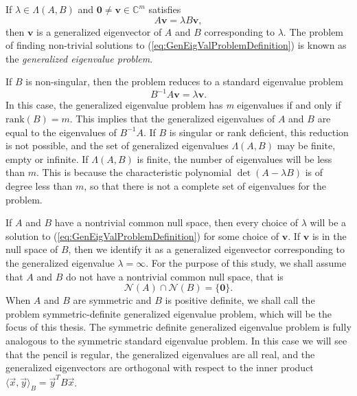 If $\lambda \in \Lambda(A, B)$ and $\mathbf{0} \neq \mathbf{v} \in \mathbb{C}^m$ satisfies
\begin{equation}\label{eq:GenEigValProblemDefinition}
	A\mathbf{v} = \lambda B\mathbf{v},
\end{equation}
then $\mathbf{v}$ is a generalized eigenvector of $A$ and $B$ corresponding to $\lambda$. The problem of finding non-trivial solutions to (\ref{eq:GenEigValProblemDefinition}) is known as the \textit{generalized eigenvalue problem}.

If $B$ is non-singular, then the problem reduces to a standard eigenvalue problem
\begin{equation}\label{eq:StandardReduction}
	B^{-1}A \mathbf{v} = \lambda \mathbf{v}.
\end{equation}
In this case, the generalized eigenvalue problem has \textit{m} eigenvalues if and only if $\text{rank}(B) = m$. This implies that the generalized eigenvalues of $A$ and $B$ are equal to the eigenvalues of $B^{-1}A$. If $B$ is singular or rank deficient, this reduction is not possible, and the set of generalized eigenvalues $\Lambda(A, B)$ may be finite, empty or infinite. If $\Lambda(A, B)$ is finite, the number of eigenvalues will be less than $m$. This is because the characteristic polynomial $\det(A- \lambda B)$ is of degree less than $m$, so that there is not a complete set of eigenvalues for the problem.

If $A$ and $B$ have a nontrivial common null space, then every choice of $\lambda$ will be a solution to (\ref{eq:GenEigValProblemDefinition}) for some choice of $\mathbf{v}$. If $\mathbf{v}$ is in the null space of $B$, then we identify it as a generalized eigenvector corresponding to the generalized eigenvalue $\lambda = \infty$. For the purpose of this study, we shall assume that $A$ and $B$ do not have a nontrivial common null space, that is
\begin{equation}\label{eq:EmptyCommonNullSpace}
	\mathcal{N}(A) \cap \mathcal{N}(B) = \{\mathbf{0} \}.
\end{equation}
When $A$ and $B$ are symmetric and $B$ is positive definite, we shall call the problem symmetric-definite generalized eigenvalue problem, which will be the focus of this thesis. The symmetric definite generalized eigenvalue problem is fully analogous to the symmetric standard eigenvalue problem.  In this case we will see that the pencil is regular, the generalized eigenvalues are all real, and the generalized eigenvectors are orthogonal with respect to the inner product $\langle\vec{x}, \vec{y}\rangle_B = \vec{y}^T B \vec{x}$.

